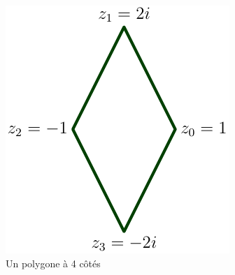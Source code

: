 \begin{figure}[h]
 \centering
 \includegraphics{./Eisoperi_1.pdf}
 \caption{Un polygone à 4 côtés}
 \label{fig:Eisoperi_1}
\end{figure}

